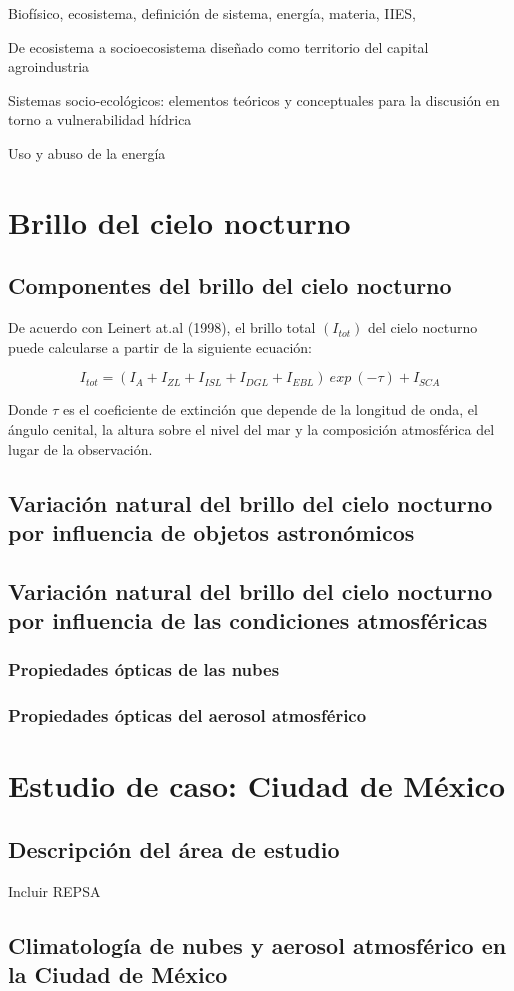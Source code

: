 Biofísico, ecosistema, definición de sistema, energía, materia, IIES, 

De ecosistema a socioecosistema diseñado
como territorio del capital agroindustria

Sistemas socio-ecológicos: elementos teóricos y conceptuales para la discusión en torno a vulnerabilidad hídrica

Uso y abuso de la energía

\section{Brillo del cielo nocturno}

\subsection{Componentes del brillo del cielo nocturno}


De acuerdo con Leinert at.al (1998), el brillo total $(I_{tot})$ del cielo nocturno puede calcularse a partir de la siguiente ecuación:

\begin{equation}\label{eq:ej}
I_{tot}=(I_A + I_{ZL} + I_{ISL} + I_{DGL} + I_{EBL})\ exp \ (-\tau) + I_{SCA}
\end{equation}

Donde $\tau$ es el coeficiente de extinción que depende de la longitud de onda, el ángulo cenital, la altura sobre el nivel del mar y la composición atmosférica del lugar de la observación.


\subsection{Variación natural del brillo del cielo nocturno por influencia de objetos astronómicos}

\subsection{Variación natural del brillo del cielo nocturno por influencia de las condiciones atmosféricas}

\subsubsection{Propiedades ópticas de las nubes}

\subsubsection{Propiedades ópticas del aerosol atmosférico}


\section{Estudio de caso: Ciudad de México}

\subsection{Descripción del área de estudio}

Incluir REPSA

\subsection{Climatología de nubes y aerosol atmosférico en la Ciudad de México}